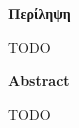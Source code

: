 
\begin{center}
\large
{\bf Περίληψη}\\[5mm]
\end{center}
TODO

\vspace{50mm}

\begin{center}
\large
{\bf Abstract}\\[5mm]
\end{center}
TODO

\newpage
\phantom{~}
\newpage